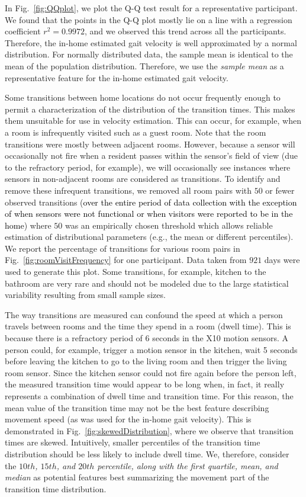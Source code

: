 \documentclass[journal]{IEEEtran}
\newcommand{\ca}[1]{\textcolor{black}{#1}}
\begin{document}
In Fig.~\ref{fig:QQplot}, we plot the Q-Q test result for a representative participant. We found that the points in the Q-Q plot mostly lie on a line with a regression coefficient $r^2 = 0.9972$, and we observed this trend across all the participants. Therefore, the in-home estimated gait velocity is well approximated by a normal distribution. For normally distributed data, the sample mean is identical to the mean of the population distribution. Therefore, we use the \emph{sample mean} as a representative feature for the in-home estimated gait velocity. 


Some transitions between home locations do not occur frequently enough to permit a characterization of the distribution of the transition times.  This makes them unsuitable for use in velocity estimation.  This can occur, for example, when a room is infrequently visited such as a guest room. Note that the room transitions were mostly between adjacent rooms. However, because a sensor will occasionally not fire when a resident passes within the sensor’s field of view (due to the refractory period, for example), we will occasionally see instances where sensors in non-adjacent rooms are considered as transitions. To identify and remove these infrequent transitions, we removed all room pairs with $50$ or fewer observed transitions (\ca{over the entire period of data collection with the exception of when sensors were not functional or when visitors were reported to be in the home}) where $50$ was an empirically chosen threshold which allows reliable estimation of distributional parameters (e.g., the mean or different percentiles). We report the percentage of transitions for various room pairs in Fig.~\ref{fig:roomVisitFrequency} for one participant. Data taken from $921$ days were used to generate this plot. 
Some transitions, for example, kitchen to the bathroom are very rare and should not be modeled due to the large statistical variability resulting from small sample sizes.


The way transitions are measured can confound the speed at which a person travels between rooms and the time they spend in a room (dwell time).  This is because there is a refractory period of 6 seconds in the X10 motion sensors.  A person could, for example, trigger a motion sensor in the kitchen, wait 5 seconds before leaving the kitchen to go to the living room and then trigger the living room sensor.  Since the kitchen sensor could not fire again before the person left, the measured transition time would appear to be long when, in fact, it really represents a combination of dwell time and transition time.  For this reason, the mean value of the transition time may not be the best feature describing movement speed (as was used for the in-home gait velocity). This is demonstrated in Fig.~\ref{fig:skewedDistribution}, where we observe that
transition times are skewed.  Intuitively, smaller percentiles of the transition time distribution should be less likely to include dwell time. We, therefore, consider the \emph{$10th$, $15th$, and $20th$ percentile, along with the  first quartile, mean, and median }as potential features best summarizing the movement part of the transition time distribution.
\end{document}

